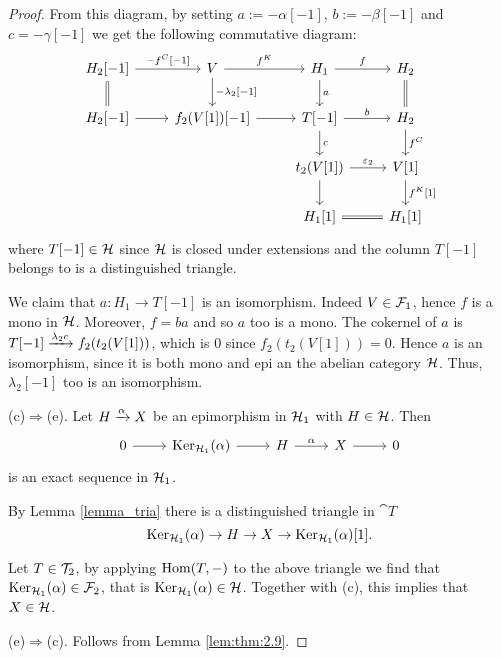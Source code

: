 \begin{proof}
  \smallskip\noindent
  

  From this diagram, by setting $a:= -\alpha[-1]$, $b:=-\beta[-1]$ and $c=-\gamma[-1]$ we get the following commutative diagram:
  \begin{equation*}
    \begin{tikzcd}
      H_2[-1]\arrow{r}{-f^C[-1]}\arrow[equal]{d}
      & V\arrow{r}{f^K}\arrow{d}{-\lambda_2[-1]}
        & H_1\arrow{r}{f}\arrow{d}{a}
          & H_2\arrow[equal]{d}\\
      H_2[-1]\arrow{r}
      & f_2(V[1])[-1]\arrow{r}
        & T[-1]\arrow{r}{b}\arrow{d}{c}
          & H_2\arrow{d}{f^C}\\
      & & t_2(V[1])\arrow{r}{\varepsilon_2}\arrow{d}
          & V[1]\arrow{d}{f^K[1]}\\
      & & H_1[1]\arrow[equal]{r}
          & H_1[1]
    \end{tikzcd}
  \end{equation*}
  where $T[-1]\in\mathcal{H}$ since $\mathcal{H}$ is closed under extensions and the column $T[-1]$ belongs to is a distinguished triangle.

  We claim that $a:H_1\to T[-1]$ is an isomorphism. Indeed $V\in\mathcal{F}_1$, hence $f$ is a mono in $\mathcal{H}$. Moreover, $f=ba$ and so $a$ too is a mono. The cokernel of $a$ is $T[-1]\xrightarrow{\lambda_2 c}f_2(t_2(V[1]))$, which is $0$ since $f_2(t_2(V[1]))=0$. Hence $a$ is an isomorphism, since it is both mono and epi an the abelian category $\mathcal{H}$. Thus, $\lambda_2[-1]$ too is an isomorphism. 

  \smallskip\noindent
  (c)$\Rightarrow$(e). Let $H\xrightarrow{\alpha}X$ be an epimorphism in $\mathcal{H}_1$ with $H\in\mathcal{H}$. Then
  \begin{equation*}
    \begin{tikzcd}
      0\arrow{r}& \Ker_{\clH_1}(\alpha)\arrow{r}& H\arrow{r}{\alpha}& X\arrow{r} & 0
    \end{tikzcd}
  \end{equation*}
  is an exact sequence in $\mathcal{H}_1$.

By Lemma \ref{lemma_tria} there is a distinguished triangle in $\cat{T}$
\[ \operatorname{Ker}_{\mathcal{H}_1}(\alpha)\to H\to X\to \operatorname{Ker}_{\mathcal{H}_1}(\alpha)[1]. \]

Let $T\in\mathcal{T}_2$, by applying $\operatorname{Hom}(T,-)$ to the above triangle we find that $\operatorname{Ker}_{\mathcal{H}_1}(\alpha)\in\mathcal{F}_2$, that is $\operatorname{Ker}_{\mathcal{H}_1}(\alpha)\in\mathcal{H}$. Together with (c), this implies that $X\in\mathcal{H}$.

  \smallskip\noindent
  (e)$\Rightarrow$(c). Follows from Lemma \ref{lem:thm:2.9}.

\end{proof}

